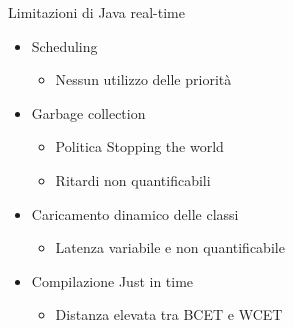 \begin{frame}{Limitazioni di Java real-time}
	\begin{itemize}
		\item Scheduling
		\begin{itemize}
			\item Nessun utilizzo delle priorità
		\end{itemize}
		\item Garbage collection
		\begin{itemize}
			\item Politica Stopping the world
			\item Ritardi non quantificabili
		\end{itemize}
		\item Caricamento dinamico delle classi
		\begin{itemize}
			\item Latenza variabile e non quantificabile
		\end{itemize}
		\item Compilazione Just in time
		\begin{itemize}
			\item Distanza elevata tra BCET e WCET
		\end{itemize}
	\end{itemize}
\end{frame}